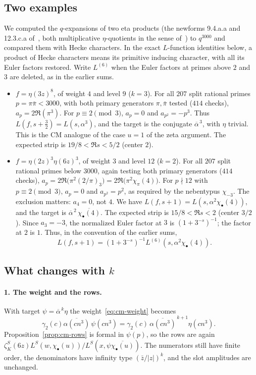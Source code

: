 \documentclass[11pt]{article}
\numberwithin{equation}{section}
\begin{document}
\subsection{Two examples}
We computed the $q$-expansions of two eta products (the newforms 9.4.a.a and 12.3.c.a of~\cite{LMFDB}, both multiplicative $\eta$-quotients in the sense of~\cite{Martin96}) to $q^{3000}$ and compared them with Hecke characters.
In the exact $L$-function identities below, a product of Hecke characters means its primitive
inducing character, with all its Euler factors restored. Write $L^{(6)}$ when the Euler factors
at primes above $2$ and $3$ are deleted, as in the earlier sums.
\begin{itemize}
\item $f=\eta(3z)^8$, of weight $4$ and level $9$ ($k=3$). For all $207$ split rational primes
 $p=\pi\bar\pi<3000$, with both primary generators $\pi,\bar\pi$ tested ($414$ checks),
 $a_p=2\Re(\pi^3)$. For $p\equiv2\pmod3$, $a_p=0$ and $a_{p^2}=-p^3$. Thus
 $L(f,s+\frac32)=L(s,\alpha^3)$, and the target is the conjugate $\overline\alpha^{\,3}$, with
 $\eta$ trivial. This is the CM analogue of the case $u=1$ of the zeta argument. The expected strip
 is $19/8<\Re s<5/2$ (center $2$).
\item $f=\eta(2z)^3\eta(6z)^3$, of weight $3$ and level $12$ ($k=2$). For all $207$ split rational primes below
 $3000$, again testing both primary generators ($414$ checks),
 $a_p=2\Re\bigl(\pi^2(2/\pi)_3\bigr)=2\Re\bigl(\pi^2\chi_\pi(4)\bigr)$. For $p\nmid12$ with $p\equiv2\pmod3$,
 $a_p=0$ and $a_{p^2}=p^2$, as required by the nebentypus $\chi_{-3}$. The exclusion matters:
 $a_4=0$, not $4$. We have $L(f,s+1)=L(s,\alpha^2\chi_\bullet(4))$, and
 the target is $\overline\alpha^{\,2}\,\overline{\chi_\bullet(4)}$. The expected strip is $15/8<\Re s<2$ (center $3/2$).
 Since $a_3=-3$, the normalized Euler factor at $3$ is $(1+3^{-s})^{-1}$; the factor at $2$ is $1$.
 Thus, in the convention of the earlier sums,
 \begin{equation}\label{eq:d088}
  L(f,s+1)=(1+3^{-s})^{-1}L^{(6)}(s,\alpha^2\chi_\bullet(4)).
 \end{equation}
\end{itemize}

\subsection{What changes with \texorpdfstring{$k$}{k}}
\paragraph{1. The weight and the rows.} With target $\psi=\overline\alpha^{\,k}\eta$ the weight~\eqref{eq:cm-weight} becomes
\begin{equation}\label{eq:d089}
 \gamma_2(c)\overline{\alpha(cn^3)}\,\psi(cn^3)=\gamma_2(c)\,\overline{\alpha(cn^3)}^{\,k+1}\eta(cn^3).
\end{equation}
Proposition~\ref{prop:cm-rows} is formal in $\psi(p)$, so the rows are again
$\zeta_K^S(6z)L^S(w,\chi_\bullet(u))/L^S(x,\psi\overline{\chi_\bullet(u)})$. The numerators still have finite order,
the denominators have infinity type $(\bar z/|z|)^k$, and the slot amplitudes are unchanged.
\end{document}
